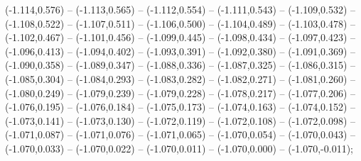 (-1.114,0.576) -- (-1.113,0.565) -- (-1.112,0.554) -- (-1.111,0.543) -- (-1.109,0.532) -- (-1.108,0.522) -- (-1.107,0.511) -- (-1.106,0.500) -- (-1.104,0.489) -- (-1.103,0.478) -- (-1.102,0.467) -- (-1.101,0.456) -- (-1.099,0.445) -- (-1.098,0.434) -- (-1.097,0.423) -- (-1.096,0.413) -- (-1.094,0.402) -- (-1.093,0.391) -- (-1.092,0.380) -- (-1.091,0.369) -- (-1.090,0.358) -- (-1.089,0.347) -- (-1.088,0.336) -- (-1.087,0.325) -- (-1.086,0.315) -- (-1.085,0.304) -- (-1.084,0.293) -- (-1.083,0.282) -- (-1.082,0.271) -- (-1.081,0.260) -- (-1.080,0.249) -- (-1.079,0.239) -- (-1.079,0.228) -- (-1.078,0.217) -- (-1.077,0.206) -- (-1.076,0.195) -- (-1.076,0.184) -- (-1.075,0.173) -- (-1.074,0.163) -- (-1.074,0.152) -- (-1.073,0.141) -- (-1.073,0.130) -- (-1.072,0.119) -- (-1.072,0.108) -- (-1.072,0.098) -- (-1.071,0.087) -- (-1.071,0.076) -- (-1.071,0.065) -- (-1.070,0.054) -- (-1.070,0.043) -- (-1.070,0.033) -- (-1.070,0.022) -- (-1.070,0.011) -- (-1.070,0.000) -- (-1.070,-0.011);
